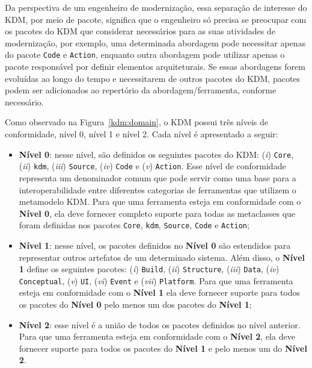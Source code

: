 Da perspectiva de um engenheiro de modernização, essa separação de interesse do KDM, por meio de pacote, significa que o engenheiro só precisa se preocupar com os pacotes do KDM que considerar necessários para as suas atividades de modernização, por exemplo, uma determinada abordagem pode necessitar apenas do pacote \texttt{Code} e \texttt{Action}, enquanto outra abordagem pode utilizar apenas o pacote responsável por definir elementos arquiteturais. Se essas abordagens forem evoluídas ao longo do tempo e necessitarem de outros pacotes do KDM, pacotes podem ser adicionados ao repertório da abordagem/ferramenta, conforme necessário.

Como observado na Figura~\ref{kdm:domain}, o KDM possui três níveis de conformidade, nível 0, nível 1 e nível 2. Cada nível é apresentado a seguir:

\begin{itemize}
    \item \textbf{Nível 0}: nesse nível, são definidos os seguintes pacotes do KDM: (\textit{i})     \texttt{Core}, (\textit{ii}) \texttt{kdm}, (\textit{iii}) \texttt{Source}, (\textit{iv}) \texttt{Code} e (\textit{v}) \texttt{Action}. Esse nível de conformidade representa um denominador comum que pode servir como uma base para a interoperabilidade entre diferentes categorias de ferramentas que utilizem o metamodelo KDM. Para que uma ferramenta esteja em conformidade com o \textbf{Nível 0}, ela deve fornecer completo suporte para todas as metaclasses que foram definidas nos pacotes \texttt{Core}, \texttt{kdm}, \texttt{Source}, \texttt{Code} e \texttt{Action};
    \item \textbf{Nível 1}: nesse nível, os pacotes definidos no \textbf{Nível 0} são estendidos para representar outros artefatos de um determinado sistema. Além disso, o \textbf{Nível 1} define os seguintes pacotes: (\textit{i}) \texttt{Build}, (\textit{ii}) \texttt{Structure}, (\textit{iii}) \texttt{Data}, (\textit{iv}) \texttt{Conceptual}, (\textit{v}) \texttt{UI}, (\textit{vi}) \texttt{Event} e (\textit{vii}) \texttt{Platform}. Para que uma ferramenta esteja em conformidade com o \textbf{Nível 1} ela deve fornecer suporte para todos os pacotes do \textbf{Nível 0} pelo menos um dos pacotes do \textbf{Nível 1};
    \item \textbf{Nível 2}: esse nível é a união de todos os pacotes definidos no nível anterior. Para que uma ferramenta esteja em conformidade com o \textbf{Nível 2}, ela deve fornecer suporte para todos os pacotes do \textbf{Nível 1} e pelo menos um do \textbf{Nível 2}.
\end{itemize}


